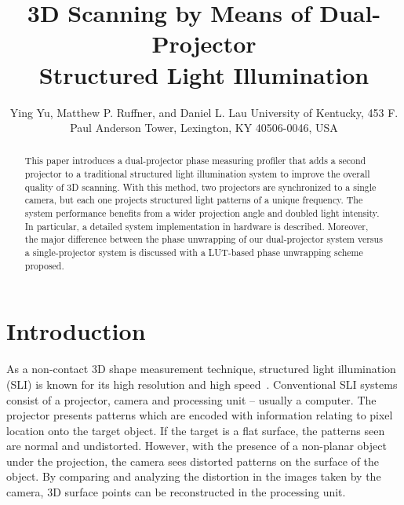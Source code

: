\documentclass[]{spie}  %
\title{3D Scanning by Means of Dual-Projector \\ Structured Light Illumination}
\author{Ying Yu\supit{a}, Matthew P. Ruffner\supit{a}, and Daniel L. Lau\supit{a}
\skiplinehalf
\supit{a}University of Kentucky, 453 F. Paul Anderson Tower, Lexington, KY 40506-0046, USA
}
\begin{document}
 
  \maketitle 

\begin{abstract}
This paper introduces a dual-projector phase measuring profiler that adds a second projector to a traditional structured light illumination system to improve the overall quality of 3D scanning. With this method, two projectors are synchronized to a single camera, but each one projects structured light patterns of a unique frequency. The system performance benefits from a wider projection angle and doubled light intensity. In particular, a detailed system implementation in hardware is described. Moreover, the major difference between the phase unwrapping of our dual-projector system versus a single-projector system is discussed with a LUT-based phase unwrapping scheme proposed. 

\end{abstract}



\section{Introduction}
\label{sec:intro}  %
As a non-contact 3D shape measurement technique, structured light illumination (SLI) is known for its high resolution and high speed~\cite{chen00}. Conventional SLI systems consist of a projector, camera and processing unit -- usually a computer. The projector presents patterns which are encoded with information relating to pixel location onto the target object. If the target is a flat surface, the patterns seen are normal and undistorted. However, with the presence of a non-planar object under the projection, the camera sees distorted patterns on the surface of the object. By comparing and analyzing the distortion in the images taken by the camera, 3D surface points can be reconstructed in the processing unit.
\end{document}
